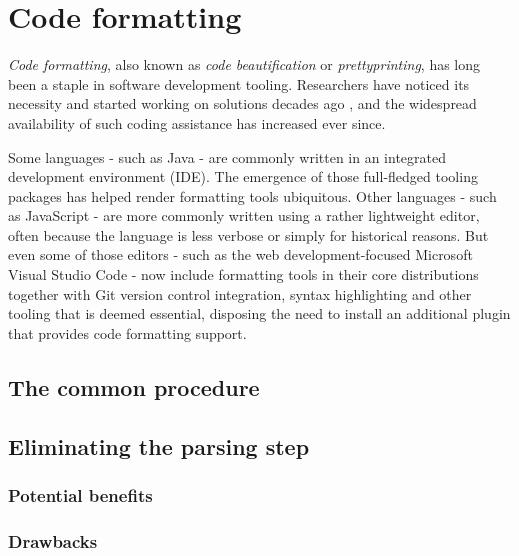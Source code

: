 \chapter{Code formatting}
\textit{Code formatting}, also known as \textit{code beautification} or \textit{prettyprinting},
has long been a staple in software development tooling.
Researchers have noticed its necessity and started working on solutions decades ago
\autocite{syntaxDirectedPrettyprinting},
and the widespread availability of such coding assistance has increased ever since.

Some languages - such as Java - are commonly written in an integrated development environment (IDE).
The emergence of those full-fledged tooling packages has helped render formatting tools ubiquitous.
Other languages - such as JavaScript - are more commonly written using a rather lightweight editor,
often because the language is less verbose or simply for historical reasons.
But even some of those editors - such as the web development-focused Microsoft Visual Studio Code -
now include formatting tools in their core distributions together with
Git version control integration, syntax highlighting and other tooling that is deemed essential,
disposing the need to install an additional plugin that provides code formatting support.

\section{The common procedure}
\section{Eliminating the parsing step}
\subsection{Potential benefits}
\subsection{Drawbacks}
